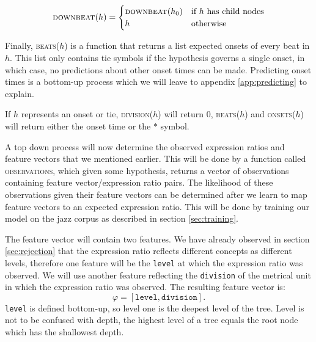 \begin{equation}
\textsc{downbeat}(h) = 
\begin{cases}
   \textsc{downbeat}(h_0) & \mbox{if $h$ has child nodes}\\
   h & \mbox{otherwise}\\
  \end{cases}
\end{equation}

Finally, \textsc{beats}($h$) is a function that returns a list expected onsets of every beat in $h$. This list only contains tie symbols if the hypothesis governs a single onset, in which case, no predictions about other onset times can be made. Predicting onset times is a bottom-up process which we will leave to appendix \ref{app:predicting} to explain.

If $h$ represents an onset or tie, \textsc{division}($h$) will return 0, \textsc{beats}($h$) and \textsc{onsets}($h$)
will return either the onset time or the $*$ symbol.

A top down process will now determine the observed expression ratios and feature vectors that we mentioned earlier. This will be done by a function called \textsc{observations}, which given some hypothesis, returns a vector of observations containing feature vector/expression ratio pairs. The likelihood of these observations given their feature vectors can be determined after we learn to map feature vectors to an expected expression ratio. This will be done by training our model on the jazz corpus as described in section \ref{sec:training}.

The feature vector will contain two features. We have already observed in section \ref{sec:rejection} that the expression ratio reflects different concepts as different levels, therefore one feature will be the \texttt{level} at which the expression ratio was observed. We will use another feature reflecting the \texttt{division} of the metrical unit in which the expression ratio was observed. The resulting feature vector is:
\begin{equation}
\label{eq:features}
\varphi = [\texttt{level}, \texttt{division}].
\end{equation}
\texttt{level} is defined bottom-up, so level one is the deepest level of the tree. Level is not to be confused with depth, the highest level of a tree equals the root node which has the shallowest depth.

